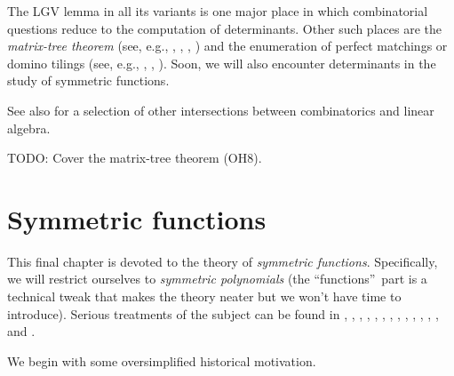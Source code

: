 The LGV lemma in all its variants is one major place in which combinatorial
questions reduce to the computation of determinants. Other such places are the
\emph{matrix-tree theorem} (see, e.g., \cite[\S 4]{Zeilbe}, \cite[\S 3.17]%
{Loehr-BC}, \cite[Theorems 9.8 and 10.4]{Stanle18}, \cite[\S 5.14]{23s}) and
the enumeration of perfect matchings or domino tilings (see, e.g.,
\cite{Stucky15}, \cite[\S 12.12--\S 12.13]{Loehr-BC}, \cite[\S 10.1]%
{Aigner07}). Soon, we will also encounter determinants in the study of
symmetric functions.

See also \cite{BruRys91} for a selection of other intersections between
combinatorics and linear algebra.

\begin{noncompile}
TODO: Cover the matrix-tree theorem (OH8).
\end{noncompile}

\section{\label{chap.sf}Symmetric functions}

This final chapter is devoted to the theory of \emph{symmetric functions}.
Specifically, we will restrict ourselves to \emph{symmetric polynomials} (the
\textquotedblleft functions\textquotedblright\ part is a technical tweak that
makes the theory neater but we won't have time to introduce). Serious
treatments of the subject can be found in \cite{Wildon20}, \cite[Chapters
10--11]{Loehr-BC}, \cite{Egge19}, \cite{MenRem15}, \cite{Macdon95},
\cite[Chapter 8]{Aigner07}, \cite[Chapter 7]{Stanley-EC2}, \cite[Chapter
7]{Sagan19}, \cite[Chapter 4]{Sagan01}, \cite{Krishn86}, \cite[Chapters
14--19]{FoaHan04}, \cite{Savage22}, \cite{SmiTut24}, \cite[Chapter 2]{GriRei}
and \cite{LLPT95}.

We begin with some oversimplified historical motivation.

